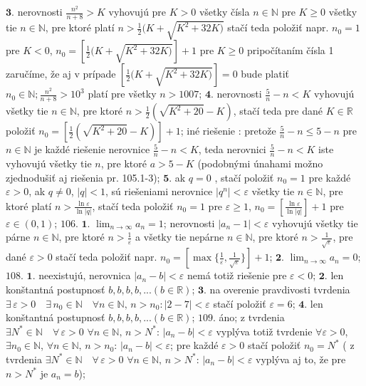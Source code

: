 $\boldsymbol{3.}$
nerovnosti $ \frac{n^{2}}{n+8}>K $ vyhovujú pre $ K > 0 $ všetky čísla $ n \in \mathbb{N} $ pre $ K \geq 0 $ všetky tie $ n \in \mathbb{N} $, pre ktoré platí $ n > \frac{1}{2} (K+ \sqrt{K^{2}+32K)} $ stačí teda položiť napr. $ n_{0}=1 $ pre $ K < 0 $, $ n_{0}= [ \frac{1}{2} (K+ \sqrt{K^{2}+32K)}] +1 $ pre $ K\geq 0 $ pripočítaním čísla 1 zaručíme, že aj v prípade $ [ \frac{1}{2} (K+ \sqrt{K^{2}+32K)}]=0 $ bude platiť $ n_{0} \in \mathbb{N}; \frac{n^{2}}{n+8}> 10^{3} $ platí pre všetky $ n > 1007 $;
$\boldsymbol{4.}$
nerovnosti $ \frac{5}{n}-n < K $ vyhovujú všetky tie $ n \in \mathbb{N} $, pre ktoré $ n > \frac{1}{2} ( \sqrt{K^{2}+20} -K)  $, stačí teda pre dané $ K \in \mathbb{R} $ položiť $ n_{0} = [ \frac{1}{2} ( \sqrt{K^{2}+20}-K )]+1 $; iné riešenie : pretože  $ \frac{5}{n}-n \leq 5-n $
pre $ n \in \mathbb{N} $ je každé riešenie nerovnice $ \frac{5}{n}-n < K $, teda nerovnici $ \frac{5}{n}-n < K $ iste vyhovujú všetky tie $ n $, pre ktoré $ a> 5-K $ (podobnými únahami možno zjednodušiť aj riešenia pr. 105.1-3);
$\boldsymbol{5.}$
ak $ q=0 $ , stačí položiť $ n_{0}=1 $ pre každé $ \varepsilon  > 0 $, ak $ q\neq 0 $, $ \vert q \vert < 1 $, sú riešeniami nerovnice $ \vert q^{n} \vert < \varepsilon $ všetky tie $ n \in \mathbb{N} $, pre ktoré platí $ n  > \frac{\ln \varepsilon}{\ln \vert q \vert} $, stačí teda položiť $ n_{0}=1 $ pre $ \varepsilon\geq 1 $, $ n_{0}= [  \frac{\ln \varepsilon}{\ln \vert q \vert} ]+1 $ pre $ \varepsilon \in (0,1) $;
$\boxed{106.}$
$\boldsymbol{1.}$
$ \lim_{n \to \infty}a_n=1$; nerovnosti $ \vert a_{n} -1 \vert < \varepsilon $ vyhovujú všetky tie párne $ n \in \mathbb{N} $, pre ktoré $ n > \frac{1}{\varepsilon} $ a všetky tie nepárne $ n \in \mathbb{N} $, pre ktoré $ n > \frac{1}{\sqrt{\varepsilon}} $, pre dané $ \varepsilon > 0 $ stačí teda položiť napr. $ n_{0}= [ \max \lbrace \frac{1}{\varepsilon} , \frac{1}{\sqrt{\varepsilon}} \rbrace ]+1 $;
$\boldsymbol{2.}$
$ \lim_{n \to \infty}a_n=0$;
$\boxed{108.}$
$\boldsymbol{1.}$
neexistujú, nerovnica $\vert a_{n}  -b \vert < \varepsilon   $ nemá totiž riešenie pre $ \varepsilon < 0 $;
$\boldsymbol{2.}$
len konštantná postupnosť $ b,b,b,b,...(b \in \mathbb{R}) $;
$\boldsymbol{3.}$
na overenie pravdivosti tvrdenia  $ \exists  \, \varepsilon > 0 \quad \exists \, n_{0 } \in \mathbb{N} \quad \forall n \in \mathbb{N} , \, n> n_{0}: \vert 2-7 \vert < \varepsilon $ stačí položiť $ \varepsilon = 6 $;
$\boldsymbol{4.}$
len konštantná postupnosť $ b,b,b,b,...(b \in \mathbb{R}) $;
$\boxed{109.}$
áno; z tvrdenia $ \exists N^{*}\in \mathbb{N} \quad \forall \, \varepsilon > 0 $ $ \forall n \in \mathbb{N} , \, n> N^{*} $: $ \vert a_{n} -b \vert < \varepsilon $ vyplýva totiž tvrdenie $ \forall \varepsilon > 0 $, $ \exists n_{0 }\in \mathbb{N} $, $ \forall n \in \mathbb{N}, \, n>n_{0} $: $ \vert a_{n} -b \vert < \varepsilon $; pre každé $ \varepsilon > 0  $ stačí položiť $ n_{0} = N^{*} $ ( z tvrdenia   $ \exists N^{*}\in \mathbb{N} \quad \forall \, \varepsilon > 0 $ $ \forall n \in \mathbb{N} , \, n> N^{*} $: $ \vert a_{n} -b \vert < \varepsilon $ vyplýva aj to, že pre  $ n> N^{*}$  je $ a_{n}=b $);
